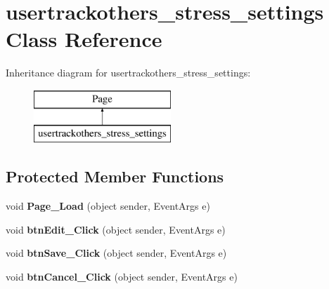 \hypertarget{classusertrackothers__stress__settings}{\section{usertrackothers\-\_\-stress\-\_\-settings Class Reference}
\label{classusertrackothers__stress__settings}
}
Inheritance diagram for usertrackothers\-\_\-stress\-\_\-settings\-:\begin{figure}[H]
\begin{center}
\leavevmode
\includegraphics[height=2.000000cm]{classusertrackothers__stress__settings}
\end{center}
\end{figure}
\subsection*{Protected Member Functions}
\begin{DoxyCompactItemize}
\item 
\hypertarget{classusertrackothers__stress__settings_afb1648c62bbf429b2281f122367f045a}{void {\bfseries Page\-\_\-\-Load} (object sender, Event\-Args e)}\label{classusertrackothers__stress__settings_afb1648c62bbf429b2281f122367f045a}

\item 
\hypertarget{classusertrackothers__stress__settings_a6cc4eb11a33a694a1df7b6b495d54654}{void {\bfseries btn\-Edit\-\_\-\-Click} (object sender, Event\-Args e)}\label{classusertrackothers__stress__settings_a6cc4eb11a33a694a1df7b6b495d54654}

\item 
\hypertarget{classusertrackothers__stress__settings_ac76c34eab1833510be467292b519c0d7}{void {\bfseries btn\-Save\-\_\-\-Click} (object sender, Event\-Args e)}\label{classusertrackothers__stress__settings_ac76c34eab1833510be467292b519c0d7}

\item 
\hypertarget{classusertrackothers__stress__settings_a036f7b73615704d296c5fc50ec271f82}{void {\bfseries btn\-Cancel\-\_\-\-Click} (object sender, Event\-Args e)}\label{classusertrackothers__stress__settings_a036f7b73615704d296c5fc50ec271f82}

\end{DoxyCompactItemize}


